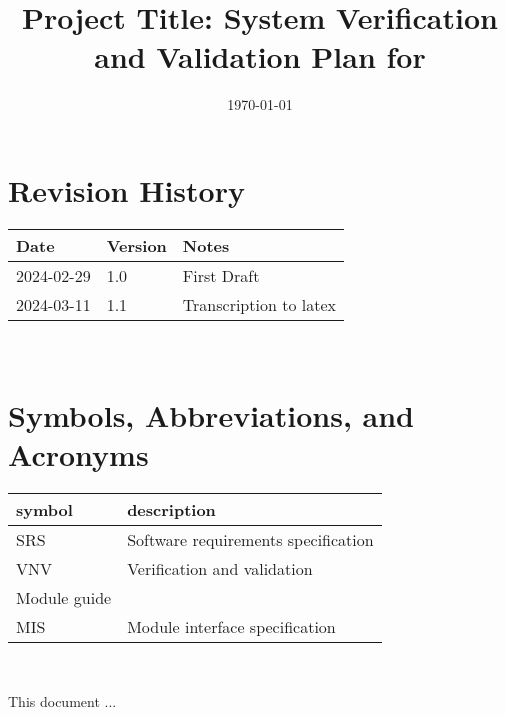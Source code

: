 \documentclass[12pt, titlepage]{article}
\begin{document}
\title{Project Title: System Verification and Validation Plan for \progname{}} 
\author{\authname}
\date{\today}

\maketitle


\section*{Revision History}

\begin{tabularx}{\textwidth}{p{3cm}p{2cm}X}
  \toprule {\bf Date} & {\bf Version} & {\bf Notes}\\
  \midrule
  2024-02-29 & 1.0 & First Draft\\
  2024-03-11 & 1.1 & Transcription to latex\\
  \bottomrule
\end{tabularx}

~\\

\newpage

\tableofcontents

\listoftables
{}

\listoffigures
{}

\newpage

\section{Symbols, Abbreviations, and Acronyms}

\renewcommand{\arraystretch}{1.2}
\begin{tabular}{l l} 
  \toprule		
  \textbf{symbol} & \textbf{description}\\
  \midrule 
  SRS & Software requirements specification\\
  VNV & Verification and validation\\
  Module guide\\
  MIS & Module interface specification\\
  \bottomrule
\end{tabular}\\


\newpage


This document ... 
\end{document}
